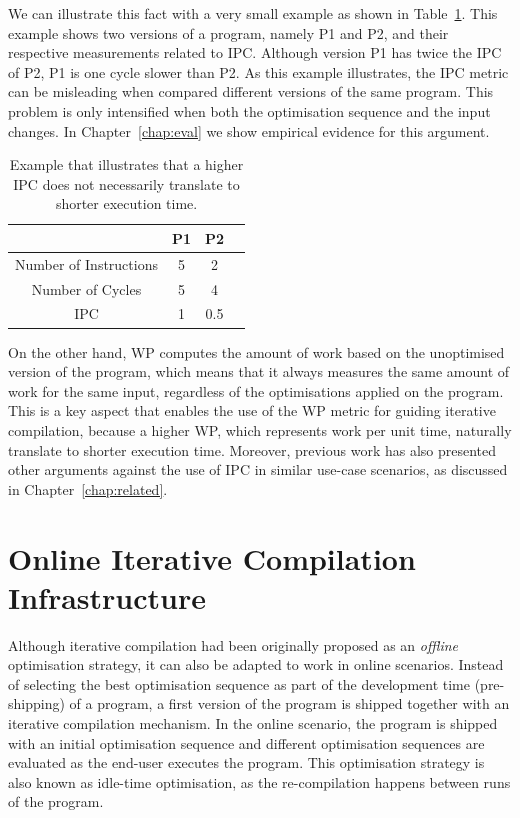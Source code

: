 \documentclass[sigplan,10pt]{acmart}
\theoremstyle{definition}
\newcommand{\itercomp}{{iterative compilation}}
\newcommand{\IterComp}{{Iterative Compilation}}
\begin{document}
We can illustrate this fact with a very small example as shown in Table~\ref{tab:ipc-example}.
This example shows two versions of a program, namely P1 and P2, and their respective measurements related to IPC.
Although version P1 has twice the IPC of P2, P1 is one cycle slower than P2.
As this example illustrates, the IPC metric can be misleading when compared different versions of the same program.
This problem is only intensified when both the optimisation sequence and the input changes.
In Chapter~\ref{chap:eval} we show empirical evidence for this argument.

\begin{table}[h]
\centering
\begin{tabular}{|c|c|c|c|}
\hline
                       & P1 & P2  \\
\hline
Number of Instructions & 5  & 2   \\
Number of Cycles       & 5  & 4   \\
IPC                    & 1  & 0.5 \\
\hline
\end{tabular}
\caption{Example that illustrates that a higher IPC does not necessarily translate to shorter execution time.}
\label{tab:ipc-example}
\end{table}

On the other hand, WP computes the amount of work based on the unoptimised version of the program, which means that it always measures the same amount of work for the same input, regardless of the optimisations applied on the program.
This is a key aspect that enables the use of the WP metric for guiding {\itercomp}, because a higher WP, which represents work per unit time, naturally translate to shorter execution time.
Moreover, previous work has also presented other arguments against the use of IPC in similar use-case scenarios, as discussed in Chapter~\ref{chap:related}.
  
\section{Online {\IterComp} Infrastructure} \label{sec:oic-infra}

Although {\itercomp} had been originally proposed as an \textit{offline} optimisation strategy, it can also be adapted to work in online scenarios.
Instead of selecting the best optimisation sequence as part of the development time (pre-shipping) of a program, a first version of the program is shipped together with an {\itercomp} mechanism.
In the online scenario, the program is shipped with an initial optimisation sequence and different optimisation sequences are evaluated as the end-user executes the program.
This optimisation strategy is also known as idle-time optimisation, as the re-compilation happens between runs of the program.
\end{document}

